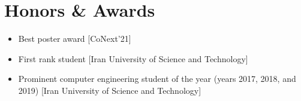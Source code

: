 \section{Honors \& Awards}
\begin{itemize}
	\renewcommand\labelitemi{\ding{118}}
	\item {Best poster award [CoNext'21]}
	\item{First rank student [Iran University of Science and Technology]}
	\item{Prominent computer engineering student of the year (years 2017, 2018, and 2019) [Iran University of Science and Technology]}
\end{itemize}

